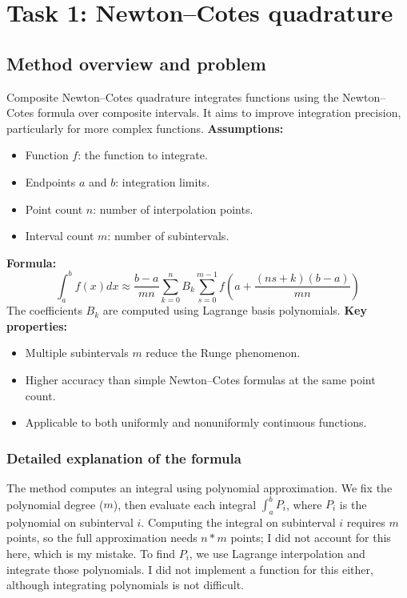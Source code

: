 \section{Task 1: Newton--Cotes quadrature}

\subsection{Method overview and problem}
Composite Newton--Cotes quadrature integrates functions using the Newton--Cotes formula over composite intervals. It aims to improve integration precision, particularly for more complex functions.
\textbf{Assumptions:}
\begin{itemize}
    \item Function \( f \): the function to integrate.
    \item Endpoints \( a \) and \( b \): integration limits.
    \item Point count \( n \): number of interpolation points.
    \item Interval count \( m \): number of subintervals.
\end{itemize}
\textbf{Formula:}
\[
\int_a^b f(x)dx \approx \frac{b-a}{mn} \sum_{k=0}^n B_k \sum_{s=0}^{m-1} f(a + \frac{(ns + k)(b-a)}{mn})
\]
The coefficients \( B_k \) are computed using Lagrange basis polynomials.
\textbf{Key properties:}
\begin{itemize}
    \item Multiple subintervals \( m \) reduce the Runge phenomenon.
    \item Higher accuracy than simple Newton--Cotes formulas at the same point count.
    \item Applicable to both uniformly and nonuniformly continuous functions.
\end{itemize}
\subsubsection{Detailed explanation of the formula}
The method computes an integral using polynomial approximation. We fix the polynomial degree ($m$), then evaluate each integral $\int_a^b P_i$, where $P_i$ is the polynomial on subinterval $i$. Computing the integral on subinterval $i$ requires $m$ points, so the full approximation needs $n * m$ points; I did not account for this here, which is my mistake. To find $P_i$, we use Lagrange interpolation and integrate those polynomials. I did not implement a function for this either, although integrating polynomials is not difficult.


